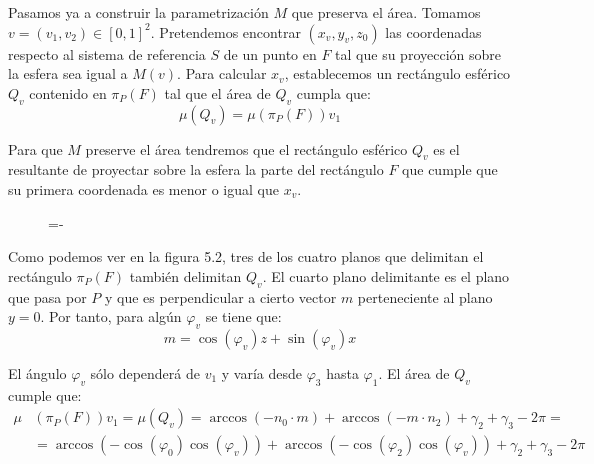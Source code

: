 Pasamos ya a construir la parametrización $M$ que preserva el área. Tomamos $v=(v_1,v_2)\in [0,1]^2$. Pretendemos encontrar $(x_v,y_v,z_0)$ las coordenadas respecto al sistema de referencia $S$ de un punto en $F$ tal que su proyección sobre la esfera sea igual a $M(v)$. Para calcular $x_v$, establecemos un rectángulo esférico $Q_v$ contenido en $\pi_P(F)$ tal que el área de $Q_v$ cumpla que:
$$\mu(Q_v) = \mu(\pi_P(F)) v_1 $$

Para que $M$ preserve el área tendremos que el rectángulo esférico $Q_v$ es el resultante de proyectar sobre la esfera la parte del rectángulo $F$ que cumple que su primera coordenada es menor o igual que $x_v$. 

\begin{figure}[h]
  \lineskip=-\fboxrule
\end{figure}

Como podemos ver en la figura 5.2, tres de los cuatro planos que delimitan el rectángulo $\pi_P(F)$ también delimitan $Q_v$. El cuarto plano delimitante es el plano que pasa por $P$ y que es perpendicular a cierto vector $m$ perteneciente al plano $y=0$. Por tanto, para algún $\varphi_v$ se tiene que:
$$m=\cos(\varphi_v)z+\sin(\varphi_v)x$$

El ángulo $\varphi_v$ sólo dependerá de $v_1$ y varía desde $\varphi_3$ hasta $\varphi_1$. El área de $Q_v$ cumple que:
\begin{align*}
\mu&(\pi_P(F))v_1 = \mu(Q_v) = \arccos(-n_0\cdot m) +\arccos(-m\cdot n_2) + \gamma_2 +\gamma_3 -2\pi =\\
&= \arccos(-\cos(\varphi_0) \cos(\varphi_v)) +\arccos(-\cos(\varphi_2) \cos(\varphi_v)) + \gamma_2 +\gamma_3 -2\pi 
\end{align*}

